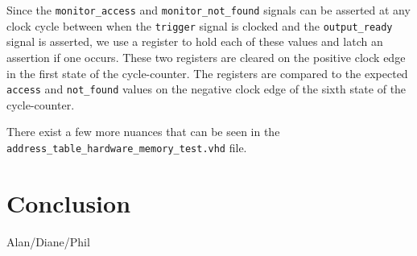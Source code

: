\documentclass{article}
\begin{document}
Since the \texttt{monitor\_access} and \texttt{monitor\_not\_found} signals can be asserted at any clock cycle between when the \texttt{trigger} signal is clocked and the \texttt{output\_ready} signal is asserted, we use a register to hold each of these values and latch an assertion if one occurs. These two registers are cleared on the positive clock edge in the first state of the cycle-counter. The registers are compared to the expected \texttt{access} and \texttt{not\_found} values on the negative clock edge of the sixth state of the cycle-counter.

There exist a few more nuances that can be seen in the \texttt{address\_table\_hardware\_memory\_test.vhd} file.

\section{Conclusion}

Alan/Diane/Phil
\end{document}
